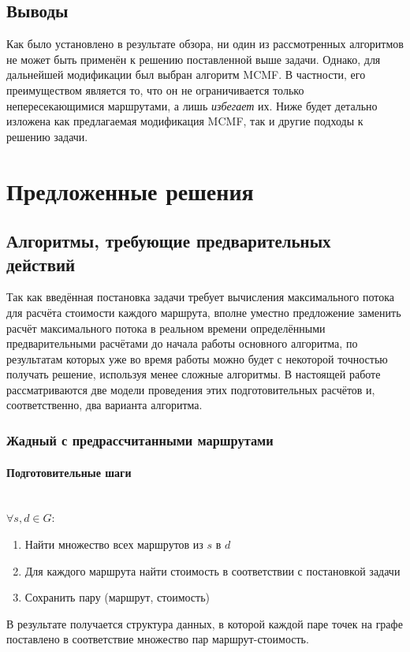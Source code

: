 \documentclass[a4paper]{article}
\begin{document}
\subsection{Выводы}
Как было установлено в результате обзора, ни один из рассмотренных алгоритмов не может быть применён к решению поставленной выше задачи. Однако, для дальнейшей модификации был выбран алгоритм MCMF. В частности, его преимуществом является то, что он не ограничивается только непересекающимися маршрутами, а лишь \textit{избегает} их. Ниже будет детально изложена как предлагаемая модификация MCMF, так и другие подходы к решению задачи.

\newpage
\section{Предложенные решения}
\subsection{Алгоритмы, требующие предварительных действий}
Так как введённая постановка задачи требует вычисления максимального потока для расчёта стоимости каждого маршрута, вполне уместно предложение заменить расчёт максимального потока в реальном времени определёнными предварительными расчётами до начала работы основного алгоритма, по результатам которых уже во время работы можно будет с некоторой точностью получать решение, используя менее сложные алгоритмы. В настоящей работе рассматриваются две модели проведения этих подготовительных расчётов и, соответственно, два варианта алгоритма. 

\subsubsection{Жадный с предрассчитанными маршрутами} 
\paragraph{Подготовительные шаги}\mbox{}\\
$\forall s, d \in G: $
\begin{enumerate}
\item Найти множество всех маршрутов из $s$ в $d$
\item Для каждого маршрута найти стоимость в соответствии с постановкой задачи
\item Сохранить пару (маршрут, стоимость)
\end{enumerate}
В результате получается структура данных, в которой каждой паре точек на графе поставлено в соответствие множество пар маршрут-стоимость.
\end{document}
